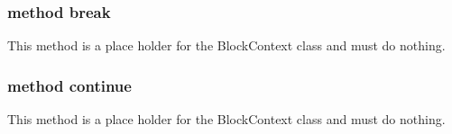 \subsubsection{method break}
This method is a place holder for the BlockContext class and must do nothing.

\subsubsection{method continue}
This method is a place holder for the BlockContext class and must do nothing.
